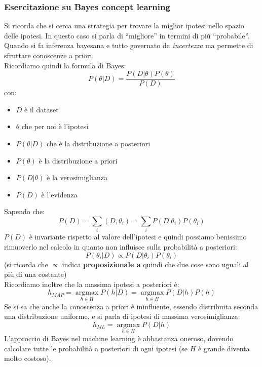 \subsubsection{Esercitazione su Bayes concept learning}
Si ricorda che si cerca una strategia per trovare la miglior ipotesi nello
spazio delle ipotesi. In questo caso si parla di ``migliore'' in termini di più
``probabile''. \\
Quando si fa inferenza bayesana e tutto governato da \textit{incertezza} ma
permette di sfruttare conoscenze a priori.\\
Ricordiamo quindi la formula di Bayes:
\[P(\theta|D)=\frac{P(D|\theta)P(\theta)}{P(D)}\]
con:
\begin{itemize}
  \item $D$ è il dataset
  \item $\theta$ che per noi è l'ipotesi
  \item $P(\theta|D)$ che è la distribuzione a posteriori
  \item $P(\theta)$ è la distribuzione a priori
  \item $P(D|\theta)$ è la verosimiglianza
  \item $P(D)$ è l'evidenza
\end{itemize}
Sapendo che:
\[P(D)=\sum_i(D, \theta_i)=\sum_i P(D|\theta_i)P(\theta_i)\]
$P(D)$ è invariante rispetto al valore dell'ipotesi e quindi possiamo benissimo
rimuoverlo nel calcolo in quanto non influisce sulla probabilità a posteriori:
\[P(\theta_i|D)\varpropto P(D|\theta_i)P(\theta_i)\]
(si ricorda che $\varpropto$ indica \textbf{proposizionale a} quindi che due
cose sono uguali al più di una costante)\\
Ricordiamo inoltre che la massima ipotesi a posteriori è:
\[h_{MAP}=\operatorname*{argmax}_{h\in H}P(h|D)=
  \operatorname*{argmax}_{h\in H}P(D|h)P(h)\]
Se si sa che anche la conoscenza a priori è ininfluente, essendo distribuita
seconda una distribuzione uniforme, e si parla di ipotesi di massima
verosimiglianza:
\[h_{ML}=\operatorname*{argmax}_{h\in H}P(D|h)\]
L'approccio di Bayes nel machine learning è abbastanza oneroso, dovendo
calcolare tutte le probabilità a posteriori di ogni ipotesi (se $H$ è grande
diventa molto costoso).
